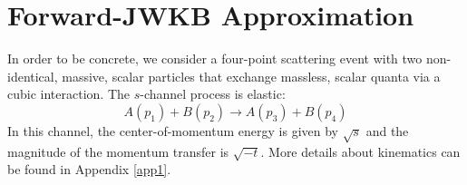 \section{Forward-JWKB Approximation\label{sec2}}
In order to be concrete, we consider a four-point scattering event with two non-identical, massive, scalar particles that exchange massless, scalar quanta via a cubic interaction. The $s$-channel process is elastic:
\begin{equation}
	A(p_{1}) + B(p_{2}) \longrightarrow A(p_{3}) + B(p_{4}) \label{ScaProc}
\end{equation}
In this channel, the center-of-momentum energy is given by $\sqrt{s}$ and the magnitude of the momentum transfer is $\sqrt{-t}$. More details about kinematics can be found in Appendix \ref{app1}.
